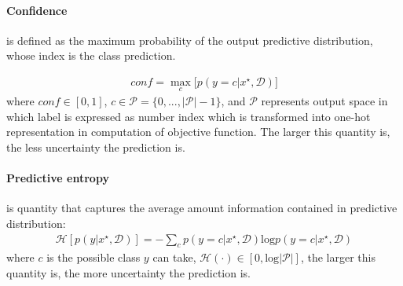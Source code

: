 \paragraph{Confidence} is defined as the maximum probability of the output predictive distribution, whose index is the class prediction.

\begin{equation}\label{confidence}	
\begin{aligned}
conf = \max_c \big[ p(y=c|x^\star, \mathcal D) \big]
\end{aligned}
\end{equation}
where $conf \in [0,1]$, $c \in \mathcal P = \{0,...,|\mathcal P|-1\}$, and $\mathcal P$ represents output space in which label is expressed as number index which is transformed into one-hot representation in computation of objective function. The larger this quantity is, the less uncertainty the prediction is. 

\paragraph{Predictive entropy} is quantity that captures the average amount information contained in predictive distribution\cite{shannon1948mathematical}: 
\begin{equation}\label{entropy}	
\begin{aligned}
\mathcal H[p(y|x^\star, \mathcal D)] = -\sum_{c}p(y=c|x^\star, \mathcal D)\text{log}p(y=c|x^\star, \mathcal D)
\end{aligned}
\end{equation}
where $c$ is the possible class $y$ can take, $\mathcal H(\cdot) \in [0, \text{log}{|\mathcal P|}]$, the larger this quantity is, the more uncertainty the prediction is.

